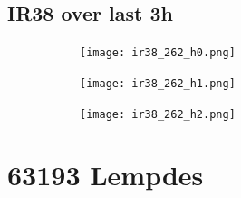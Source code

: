 \documentclass{article}
\begin{document}
\vspace{-1em}
\subsection*{IR38 over last 3h}
\vspace{-1em}
\begin{figure}[H]
    \centering
    \begin{subfigure}[b]{0.32\textwidth}
        \centering
        \texttt{[image: ir38\_262\_h0.png]} %
    \end{subfigure}
    \begin{subfigure}[b]{0.32\textwidth}
        \centering
        \texttt{[image: ir38\_262\_h1.png]} %
    \end{subfigure}
    \begin{subfigure}[b]{0.32\textwidth}
        \centering
        \texttt{[image: ir38\_262\_h2.png]} %
    \end{subfigure}
\end{figure}

\vspace{-1em}
\section*{63193 Lempdes}
\vspace{-1em}
\end{document}
